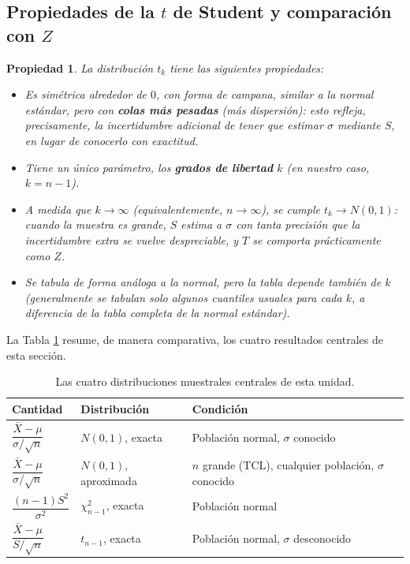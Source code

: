 \documentclass[11pt,a4paper]{article}
\theoremstyle{plain}
\newtheorem{propiedad}[teorema]{Propiedad}
\theoremstyle{definition}
\theoremstyle{remark}
\begin{document}
\subsection{Propiedades de la $t$ de Student y comparación con $Z$}

\begin{propiedad}
La distribución $t_k$ tiene las siguientes propiedades:
\begin{itemize}
\item Es simétrica alrededor de $0$, con forma de campana, similar a la normal estándar, pero con \textbf{colas más pesadas} (más dispersión): esto refleja, precisamente, la incertidumbre adicional de tener que estimar $\sigma$ mediante $S$, en lugar de conocerlo con exactitud.
\item Tiene un único parámetro, los \textbf{grados de libertad} $k$ (en nuestro caso, $k=n-1$).
\item A medida que $k\to\infty$ (equivalentemente, $n\to\infty$), se cumple $t_k \to N(0,1)$: cuando la muestra es grande, $S$ estima a $\sigma$ con tanta precisión que la incertidumbre extra se vuelve despreciable, y $T$ se comporta prácticamente como $Z$.
\item Se tabula de forma análoga a la normal, pero la tabla depende también de $k$ (generalmente se tabulan solo algunos cuantiles usuales para cada $k$, a diferencia de la tabla completa de la normal estándar).
\end{itemize}
\end{propiedad}

La Tabla \ref{tab:comparacion} resume, de manera comparativa, los cuatro resultados centrales de esta sección.

\begin{table}[h]
\centering
\small
\begin{tabular}{lll}
\toprule
\textbf{Cantidad} & \textbf{Distribución} & \textbf{Condición} \\
\midrule
$\dfrac{\bar X-\mu}{\sigma/\sqrt n}$ & $N(0,1)$, exacta & Población normal, $\sigma$ conocido \\[1em]
$\dfrac{\bar X-\mu}{\sigma/\sqrt n}$ & $N(0,1)$, aproximada & $n$ grande (TCL), cualquier población, $\sigma$ conocido \\[1em]
$\dfrac{(n-1)S^2}{\sigma^2}$ & $\chi^2_{n-1}$, exacta & Población normal \\[1em]
$\dfrac{\bar X-\mu}{S/\sqrt n}$ & $t_{n-1}$, exacta & Población normal, $\sigma$ desconocido \\
\bottomrule
\end{tabular}
\caption{Las cuatro distribuciones muestrales centrales de esta unidad.}
\label{tab:comparacion}
\end{table}
\end{document}
